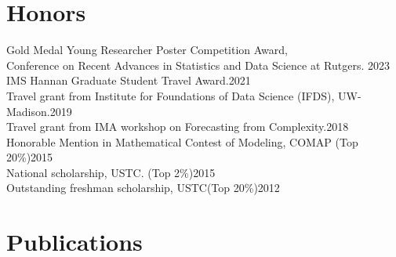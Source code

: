 \documentclass[letterpaper,11pt]{article}
\begin{document}
		\section{Honors}
	{ Gold Medal Young Researcher Poster Competition Award, \\Conference on Recent Advances in Statistics and Data Science at Rutgers. \hfill 2023\\
		
		IMS Hannan Graduate Student Travel Award.\hfill 2021\\
		Travel grant from Institute for Foundations of Data Science (IFDS), UW-Madison.\hfill                       2019\\
		Travel grant from IMA workshop on Forecasting from Complexity.\hfill                              2018\\
		Honorable Mention in Mathematical Contest of Modeling, COMAP (Top 20\%)\hfill        2015\\
		National scholarship, USTC. (Top 2\%)\hfill                                       2015\\
		Outstanding freshman scholarship, USTC(Top 20\%)\hfill                                   2012\\}
	
	\section{Publications}
\end{document}

